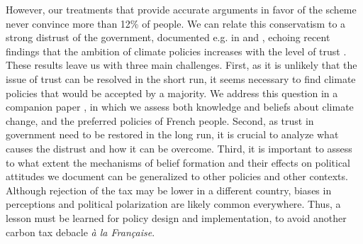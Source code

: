 \documentclass[11pt]{article}
\begin{document}
However, our treatments that provide accurate arguments in favor of the scheme never convince more than 12\% of people. We can relate this conservatism to a strong distrust of the government, documented e.g. in \citet{alesina_intergenerational_2018} and \citet{algan_et_al_19}, echoing recent findings that the ambition of climate policies increases with the level of trust \citep{rafaty_perceptions_2018}. These results leave us with three main challenges. First, as it is unlikely that the issue of trust can be resolved in the short run, it seems necessary to find climate policies that would be accepted by a majority. We address this question in a companion paper \citep{douenne_french_2019}, in which we assess both knowledge and beliefs about climate change, and the preferred policies of French people. Second, as trust in government need to be restored in the long run, it is crucial to analyze what causes the distrust and how it can be overcome. Third, it is important to assess to what extent the mechanisms of belief formation and their effects on political attitudes we document can be generalized to other policies and other contexts. Although rejection of the tax may be lower in a different country, biases in perceptions and political polarization are likely common everywhere. Thus, a lesson must be learned for policy design and implementation, to avoid another carbon tax debacle \textit{à la Française}.


\end{document}

